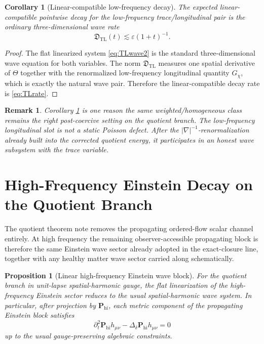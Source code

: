 \documentclass[11pt]{article}
\newtheorem{proposition}{Proposition}
\newtheorem{remark}{Remark}
\newtheorem{corollary}{Corollary}
\begin{document}
\begin{corollary}[Linear-compatible low-frequency decay]
\label{cor:TLdecay}
The expected linear-compatible pointwise decay for the low-frequency trace/longitudinal pair is the ordinary three-dimensional wave rate
\begin{equation}
\mathfrak D_{\mathrm{TL}}(t)\lesssim \varepsilon(1+t)^{-1}.
\label{eq:TLrate}
\end{equation}
\end{corollary}

\begin{proof}
The flat linearized system \eqref{eq:TLwave2} is the standard three-dimensional wave equation for both variables. The norm \(\mathfrak D_{\mathrm{TL}}\) measures one spatial derivative of \(\Theta\) together with the renormalized low-frequency longitudinal quantity \(G_\chi\), which is exactly the natural wave pair. Therefore the linear-compatible decay rate is \eqref{eq:TLrate}.
\end{proof}

\begin{remark}
Corollary \ref{cor:TLdecay} is one reason the same weighted/homogeneous class remains the right post-coercive setting on the quotient branch. The low-frequency longitudinal slot is not a static Poisson defect. After the \(|\nabla|^{-1}\)-renormalization already built into the corrected quotient energy, it participates in an honest wave subsystem with the trace variable.
\end{remark}

\section{High-Frequency Einstein Decay on the Quotient Branch}

The quotient theorem note removes the propagating ordered-flow scalar channel entirely. At high frequency the remaining observer-accessible propagating block is therefore the same Einstein wave sector already adopted in the exact-closure line, together with any healthy matter wave sector carried along schematically.

\begin{proposition}[Linear high-frequency Einstein wave block]
\label{prop:Einwave}
For the quotient branch in unit-lapse spatial-harmonic gauge, the flat linearization of the high-frequency Einstein sector reduces to the usual spatial-harmonic wave system. In particular, after projection by \(\mathbf P_{\mathrm{hi}}\), each metric component of the propagating Einstein block satisfies
\begin{equation}
\partial_t^2 \mathbf P_{\mathrm{hi}}h_{\mu\nu}
-\Delta_\delta \mathbf P_{\mathrm{hi}}h_{\mu\nu}
=0
\label{eq:Einwave}
\end{equation}
up to the usual gauge-preserving algebraic constraints.
\end{proposition}
\end{document}
